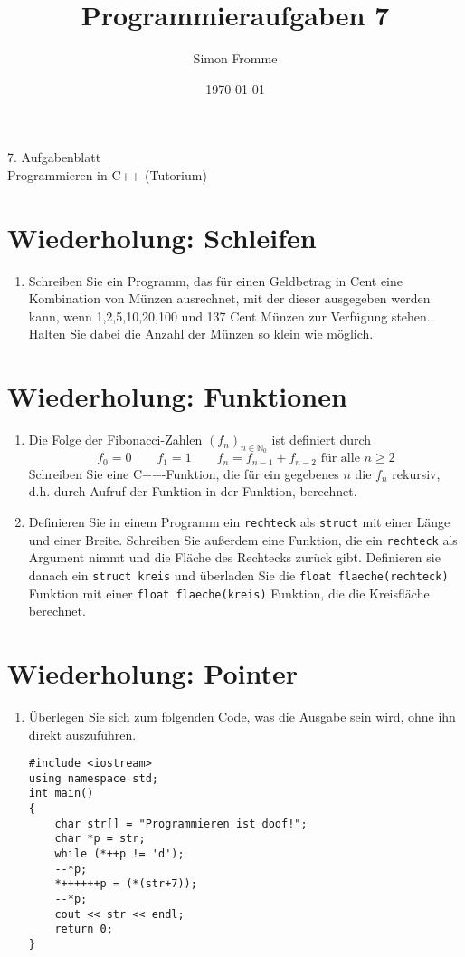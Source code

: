 \documentclass[paper=a4, fontsize=11pt, twoside]{scrartcl}
\title{Programmieraufgaben 7}
\author{Simon Fromme}
\date{\normalsize\today}
\begin{document}
\vspace*{0.75\baselineskip}
\begin{center}
  \Large 7. Aufgabenblatt \\\vspace{0.5em} \large Programmieren in C++ (Tutorium)
\end{center}
\section*{Wiederholung: Schleifen}
\begin{enumerate}
	\item Schreiben Sie ein Programm, das für einen Geldbetrag in Cent eine Kombination von Münzen ausrechnet, mit der dieser ausgegeben werden kann, wenn 1,2,5,10,20,100 und 137 Cent Münzen zur Verfügung stehen. Halten Sie dabei die Anzahl der Münzen so klein wie möglich. 
\end{enumerate}


\section*{Wiederholung: Funktionen}
\begin{enumerate}[resume]
  \item Die Folge der Fibonacci-Zahlen $(f_{n})_{n\in\mathbb{N}_0}$ ist definiert durch 
	  \[
		  f_0=0 \qquad f_1=1 \qquad f_n=f_{n-1} + f_{n-2} \text{ für alle } n\geq 2
	  \]
	  Schreiben Sie eine C++-Funktion, die für ein gegebenes $n$ die $f_n$ rekursiv, d.h. durch Aufruf der Funktion in der Funktion, berechnet.
  \item Definieren Sie in einem Programm ein \texttt{rechteck} als \texttt{struct} mit einer Länge und einer Breite.
	  Schreiben Sie außerdem eine Funktion, die ein \texttt{rechteck} als Argument nimmt und die Fläche des Rechtecks zurück gibt. 
	  Definieren sie danach ein \texttt{struct kreis} und überladen Sie die \texttt{float flaeche(rechteck)} Funktion mit einer \texttt{float flaeche(kreis)} Funktion, die die Kreisfläche berechnet.
\end{enumerate}

\section*{Wiederholung: Pointer}
\begin{enumerate}[resume]
  \item Überlegen Sie sich zum folgenden Code, was die Ausgabe sein wird, ohne ihn direkt auszuführen. 
	  \begin{verbatim}
#include <iostream>
using namespace std;
int main()
{
	char str[] = "Programmieren ist doof!";
	char *p = str;
	while (*++p != 'd');
	--*p;
	*++++++p = (*(str+7));
	--*p;
	cout << str << endl;
	return 0;
}
	  \end{verbatim}
\end{enumerate}
\end{document}
